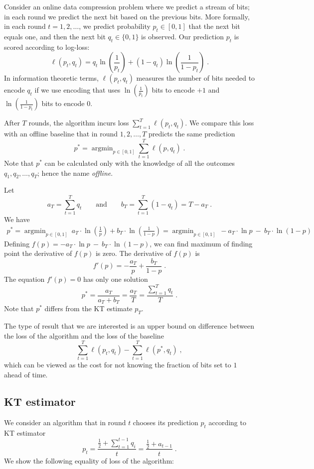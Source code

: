 \documentclass{article}
\DeclareMathOperator*{\argmin}{argmin}
\begin{document}
Consider an online data compression problem where we predict a stream of bits;
in each round we predict the next bit based on the previous bits.  More
formally, in each round $t=1,2,\dots$, we predict probability $p_t \in [0,1]$
that the next bit equals one, and then the next bit $q_t \in \{0, 1\}$ is
observed.  Our prediction $p_t$ is scored according to log-loss:
$$
\ell(p_t, q_t) = q_t \ln\left( \frac{1}{p_t}\right) + (1-q_t) \ln  \left( \frac{1}{1 - p_t} \right) \; .
$$
In information theoretic terms, $\ell(p_t, q_t)$ measures the number of bits
needed to encode $q_t$ if we use encoding that uses $\ln(\frac{1}{p_t})$ bits
to encode $+1$ and $\ln(\frac{1}{1 - p_t})$ bits to encode $0$.

After $T$ rounds, the algorithm incurs loss $\sum_{t=1}^T \ell(p_t, q_t)$. We
compare this loss with an offline baseline that in round $1,2,\dots,T$ predicts
the same prediction
$$
p^* = \argmin_{p \in [0,1]} \sum_{t=1}^T \ell(p, q_t) \; .
$$
Note that $p^*$ can be calculated only with the knowledge of all the outcomes
$q_1, q_2, \dots, q_T$; hence the name \emph{offline}.

Let
$$
a_T = \sum_{t=1}^T q_t \qquad \text{and} \qquad b_T = \sum_{t=1}^T (1 - q_t) = T - a_T \; .
$$
We have
\begin{align*}
p^*
= \argmin_{p \in [0,1]} \ a_T \cdot  \ln \left( \frac{1}{p} \right) + b_T \cdot \ln \left( \frac{1}{1-p} \right)
= \argmin_{p \in [0,1]} \ - a_T \cdot  \ln p \ - \  b_T \cdot \ln (1-p)
\end{align*}
Defining $f(p) = - a_T \cdot  \ln p \ - \  b_T \cdot \ln(1-p)$, we can find maximum of
finding point the derivative of $f(p)$ is zero. The derivative of $f(p)$ is
$$
f'(p) = - \frac{a_T}{p} + \frac{b_T}{1-p} \; .
$$
The equation $f'(p) = 0$ has only one solution
$$
p^* = \frac{a_T}{a_T + b_T} = \frac{a_T}{T} = \frac{\sum_{t=1}^T q_t}{T} \; .
$$
Note that $p^*$ differs from the KT estimate $p_T$.

The type of result that we are interested is an upper bound on difference
between the loss of the algorithm and the loss of the baseline
$$
\sum_{t=1}^T \ell(p_t, q_t) - \sum_{t=1}^T \ell(p^*, q_t) \; ,
$$
which can be viewed as the cost for not knowing the fraction of bits set to $1$
ahead of time.

\subsection{KT estimator}

We consider an algorithm that in round $t$ chooses its prediction $p_t$
according to KT estimator
$$
p_t = \frac{\frac{1}{2} + \sum_{t=1}^{t-1} q_i}{t} = \frac{\frac{1}{2} + a_{t-1}}{t} \; .
$$
We show the following equality of loss of the algorithm:
\end{document}
